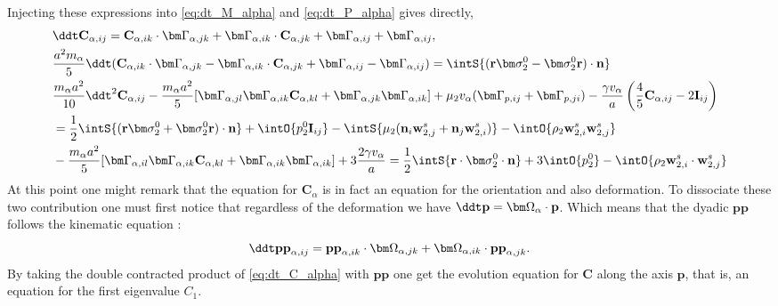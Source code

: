 Injecting these expressions into \ref{eq:dt_M_alpha} and \ref{eq:dt_P_alpha} gives directly, 
\begin{align}
    \label{eq:dt_C_alpha}
    &\ddt \textbf{C}_{\alpha,ij}
    = \textbf{C}_{\alpha,ik} \cdot \bm\Gamma_{\alpha,jk}
    +  \bm\Gamma_{\alpha,ik} \cdot \textbf{C}_{\alpha,jk}
    +  \bm\Gamma_{\alpha,ij} + \bm\Gamma_{\alpha,ij}
    ,\\
    &\frac{a^2  m_\alpha}{5} \ddt( 
        \textbf{C}_{\alpha,ik} \cdot \bm\Gamma_{\alpha,jk}
        -  \bm\Gamma_{\alpha,ik} \cdot \textbf{C}_{\alpha,jk}
        +  
        \bm\Gamma_{\alpha,ij} - \bm\Gamma_{\alpha,ij}
    )
    =  
    \intS{(\textbf{r}\bm\sigma_2^0- \bm\sigma_2^0\textbf{r})\cdot \textbf{n}}\\
    &\frac{m_\alpha a^2}{10}\ddt^2 \textbf{C}_{\alpha,ij}
    - \frac{m_\alpha a^2}{5}[
        \bm\Gamma_{\alpha,jl}\bm\Gamma_{\alpha,ik} \textbf{C}_{\alpha,kl} 
        + \bm\Gamma_{\alpha,jk}\bm\Gamma_{\alpha,ik} 
    ]
    + \mu_2 v_\alpha (\bm \Gamma_{p,ij}+\bm \Gamma_{p,ji})
    - \frac{ \gamma v_\alpha }{ a} \left(\frac{4}{5}
        \textbf{C}_{\alpha,ij}
        -2 \textbf{I}_{ij}
    \right)\nonumber\\
    &= \frac{1}{2}\intS{(\textbf{r}\bm\sigma_2^0+ \bm\sigma_2^0\textbf{r})\cdot \textbf{n}}
    + \intO{p_2^0 \textbf{I}_{ij}}
    - \intS{\mu_2 (\textbf{n}_i \textbf{w}_{2,j}^s + \textbf{n}_j \textbf{w}_{2,i}^s)}
    - \intO{\rho_2 \textbf{w}_{2,i}^s\textbf{w}_{2,j}^s} \\
    &- \frac{m_\alpha a^2}{5}[
        \bm\Gamma_{\alpha,il}\bm\Gamma_{\alpha,ik} \textbf{C}_{\alpha,kl} 
        + \bm\Gamma_{\alpha,ik}\bm\Gamma_{\alpha,ik} 
    ]
    + 3 \frac{ 2 \gamma v_\alpha }{ a} 
= \frac{1}{2}\intS{\textbf{r}\cdot \bm\sigma_2^0\cdot \textbf{n}}
    + 3 \intO{p_2^0 }
    - \intO{\rho_2 \textbf{w}_{2,i}^s\cdot\textbf{w}_{2,j}^s} 
\end{align}
At this point one might remark that the equation for $\textbf{C}_\alpha$ is in fact an equation for the orientation and also deformation. 
To dissociate these two contribution one must first notice that regardless of the deformation we have $\ddt \textbf{p} = \bm\Omega_\alpha \cdot \textbf{p}$.
Which means that the dyadic $\textbf{pp}$ follows the kinematic equation :
\begin{equation*}
    \ddt \textbf{pp}_{\alpha,ij}
    =  \textbf{pp}_{\alpha,ik} \cdot \bm\Omega_{\alpha,jk}
    +  \bm\Omega_{\alpha,ik} \cdot \textbf{pp}_{\alpha,jk}.
\end{equation*}
By taking the double contracted product of \ref{eq:dt_C_alpha} with $\textbf{pp}$ one get the evolution equation for $\textbf{C}$ along the axis $\textbf{p}$, that is, an equation for the first eigenvalue $C_1$.
